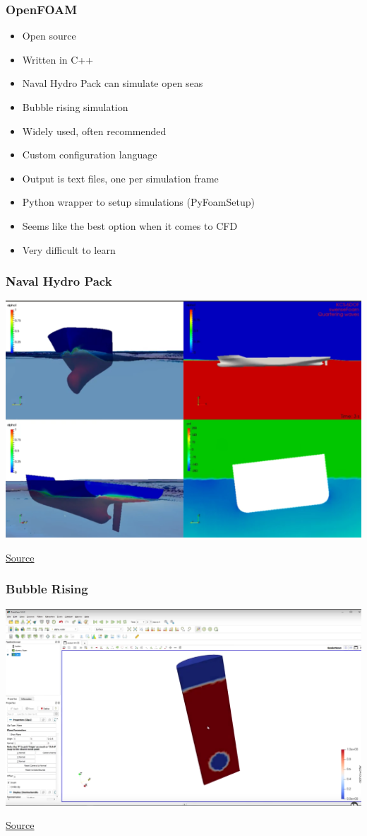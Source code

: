 \documentclass{beamer}
\begin{document}
\begin{frame}
    \frametitle{OpenFOAM}
    \begin{itemize}
        \item Open source
        \item Written in C++
        \item Naval Hydro Pack can simulate open seas
        \item Bubble rising simulation
        \item Widely used, often recommended
        \item Custom configuration language
        \item Output is text files, one per simulation frame
        \item Python wrapper to setup simulations (PyFoamSetup)
        \item Seems like the best option when it comes to CFD
        \item Very difficult to learn
    \end{itemize}
\end{frame}

\begin{frame}
    \frametitle{Naval Hydro Pack}
    \begin{center}
        \includegraphics[width=0.8\columnwidth]{naval-hydro}
    \end{center}
    \href{https://openfoam-extend.sourceforge.net/OpenFOAM_Workshops/OFW11_2016_Guimaraes/special.html}{Source}
\end{frame}

\begin{frame}
    \frametitle{Bubble Rising}
    \begin{center}
        \includegraphics[width=0.8\columnwidth]{bubble-rising-1}
    \end{center}
    \href{https://www.youtube.com/watch?v=JYHhF25OTm0}{Source}
\end{frame}
\end{document}
